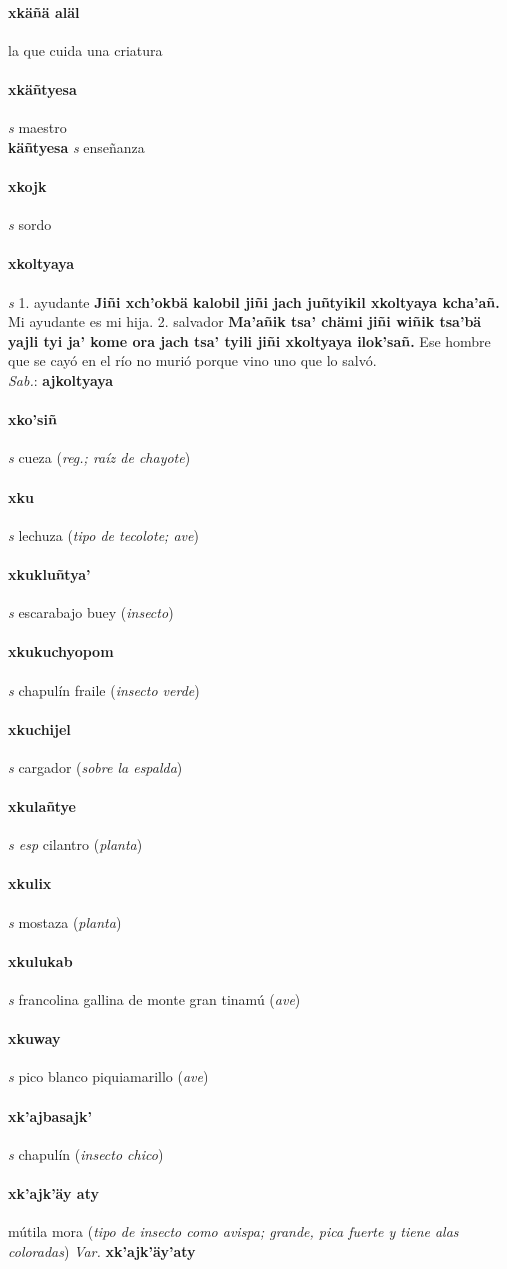 \documentclass{scrbook}
\newcommand{\entry}[1]{\paragraph{#1}}
\newcommand{\onedefinition}[1]{#1.}
\newcommand{\partofspeech}[1]{\textit{#1}}
\newcommand{\spanishtranslation}[1]{#1}
\newcommand{\clarification}[1]{(\textit{#1})}
\newcommand{\cholexample}[1]{\textbf{#1}}
\newcommand{\exampletranslation}[1]{#1}
\newcommand{\dialectvariant}[1]{\\\textit{#1}:}
\newcommand{\dialectword}[1]{\textbf{#1}}
\newcommand{\secondaryentry}[1]{\\\textbf{#1}}
\newcommand{\secondpartofspeech}[1]{\textit{#1}}
\newcommand{\secondtranslation}[1]{#1}
\newcommand{\variation}[1]{\textit{Var.} \textbf{#1}}
\begin{document}
\begin{multicols}{2}
\entry{xkäñä aläl}
\spanishtranslation{la que cuida una criatura}

\entry{xkäñtyesa}
\partofspeech{s}
\spanishtranslation{maestro}
\secondaryentry{käñtyesa}
\secondpartofspeech{s}
\secondtranslation{enseñanza}

\entry{xkojk}
\partofspeech{s}
\spanishtranslation{sordo}

\entry{xkoltyaya}
\partofspeech{s}
\onedefinition{1}
\spanishtranslation{ayudante}
\cholexample{Jiñi xch'okbä kalobil jiñi jach juñtyikil xkoltyaya kcha'añ.}
\exampletranslation{Mi ayudante es mi hija.}
\onedefinition{2}
\spanishtranslation{salvador}
\cholexample{Ma'añik tsa' chämi jiñi wiñik tsa'bä yajli tyi ja' kome ora jach tsa' tyili jiñi xkoltyaya ilok'sañ.}
\exampletranslation{Ese hombre que se cayó en el río no murió porque vino uno que lo salvó.}
\dialectvariant{Sab.}
\dialectword{ajkoltyaya}

\entry{xko'siñ}
\partofspeech{s}
\spanishtranslation{cueza}
\clarification{reg.; raíz de chayote}

\entry{xku}
\partofspeech{s}
\spanishtranslation{lechuza}
\clarification{tipo de tecolote; ave}

\entry{xkukluñtya'}
\partofspeech{s}
\spanishtranslation{escarabajo buey}
\clarification{insecto}

\entry{xkukuchyopom}
\partofspeech{s}
\spanishtranslation{chapulín fraile}
\clarification{insecto verde}

\entry{xkuchijel}
\partofspeech{s}
\spanishtranslation{cargador}
\clarification{sobre la espalda}

\entry{xkulañtye}
\partofspeech{s esp}
\spanishtranslation{cilantro}
\clarification{planta}

\entry{xkulix}
\partofspeech{s}
\spanishtranslation{mostaza}
\clarification{planta}

\entry{xkulukab}
\partofspeech{s}
\spanishtranslation{francolina}
\spanishtranslation{gallina de monte}
\spanishtranslation{gran tinamú}
\clarification{ave}

\entry{xkuway}
\partofspeech{s}
\spanishtranslation{pico blanco}
\spanishtranslation{piquiamarillo}
\clarification{ave}

\entry{xk'ajbasajk'}
\partofspeech{s}
\spanishtranslation{chapulín}
\clarification{insecto chico}

\entry{xk'ajk'äy aty}
\spanishtranslation{mútila mora}
\clarification{tipo de insecto como avispa; grande, pica fuerte y tiene alas coloradas}
\variation{xk'ajk'äy'aty}


\end{multicols}
\end{document}
